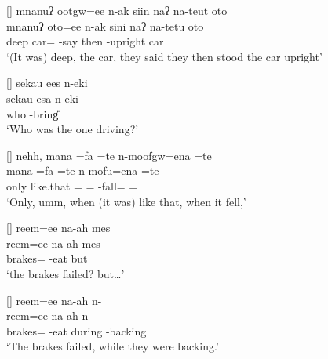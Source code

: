 \begin{exe}
{\begin{xlist}
	
\end{xlist}}

[]{
	\glll	mnanuʔ ootgw=ee n-ak siin naʔ na-teut oto\\
				mnanuʔ oto=ee n-ak sini naʔ na-tetu oto \\
				deep car={\ee} \n-say {\siin} then \nat-upright car \\
	\glt	`(It was) deep, the car, they said they then stood the car upright'}

[]{\glll
	sekau ees n-eki\\
	sekau esa n-eki\\
	who {\esc} \n-bring{\U} \\
\glt `Who was the one driving?'}

\vspace{-4pt}
[]{\glll
	 nehh, mana =fa =te n-moofgw=ena =te\\
	 {} mana =fa =te n-mofu=ena =te \\
	only {} like.that ={\fa} ={\te} \n-fall={\een} ={\te} \\
\glt `Only, umm, when (it was) like that, when it fell,'}

[]{\glll
	reem=ee na-ah mes \\
	reem=ee na-ah mes\\
	brakes={\ee} \na-eat but\\
\glt `the brakes failed? but{\ldots}'}

[]{\glll
	reem=ee na-ah  n- \\
	reem=ee na-ah  n- \\
	brakes={\ee} \na-eat during \n-backing \\
\glt `The brakes failed, while they were backing.' }


\end{exe}

